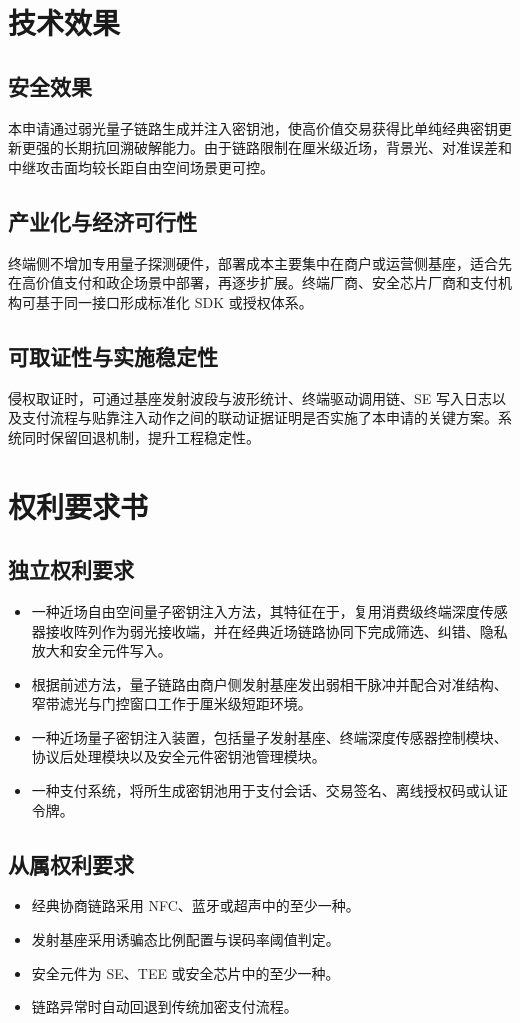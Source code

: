 ﻿\documentclass[12pt,a4paper]{article}
\begin{document}
\section{技术效果}
\subsection{安全效果}
本申请通过弱光量子链路生成并注入密钥池，使高价值交易获得比单纯经典密钥更新更强的长期抗回溯破解能力。由于链路限制在厘米级近场，背景光、对准误差和中继攻击面均较长距自由空间场景更可控。

\subsection{产业化与经济可行性}
终端侧不增加专用量子探测硬件，部署成本主要集中在商户或运营侧基座，适合先在高价值支付和政企场景中部署，再逐步扩展。终端厂商、安全芯片厂商和支付机构可基于同一接口形成标准化 SDK 或授权体系。

\subsection{可取证性与实施稳定性}
侵权取证时，可通过基座发射波段与波形统计、终端驱动调用链、SE 写入日志以及支付流程与贴靠注入动作之间的联动证据证明是否实施了本申请的关键方案。系统同时保留回退机制，提升工程稳定性。

\section{权利要求书}
\subsection{独立权利要求}
\begin{itemize}
\item 一种近场自由空间量子密钥注入方法，其特征在于，复用消费级终端深度传感器接收阵列作为弱光接收端，并在经典近场链路协同下完成筛选、纠错、隐私放大和安全元件写入。
\item 根据前述方法，量子链路由商户侧发射基座发出弱相干脉冲并配合对准结构、窄带滤光与门控窗口工作于厘米级短距环境。
\item 一种近场量子密钥注入装置，包括量子发射基座、终端深度传感器控制模块、协议后处理模块以及安全元件密钥池管理模块。
\item 一种支付系统，将所生成密钥池用于支付会话、交易签名、离线授权码或认证令牌。
\end{itemize}

\subsection{从属权利要求}
\begin{itemize}
\item 经典协商链路采用 NFC、蓝牙或超声中的至少一种。
\item 发射基座采用诱骗态比例配置与误码率阈值判定。
\item 安全元件为 SE、TEE 或安全芯片中的至少一种。
\item 链路异常时自动回退到传统加密支付流程。
\end{itemize}
\end{document}
